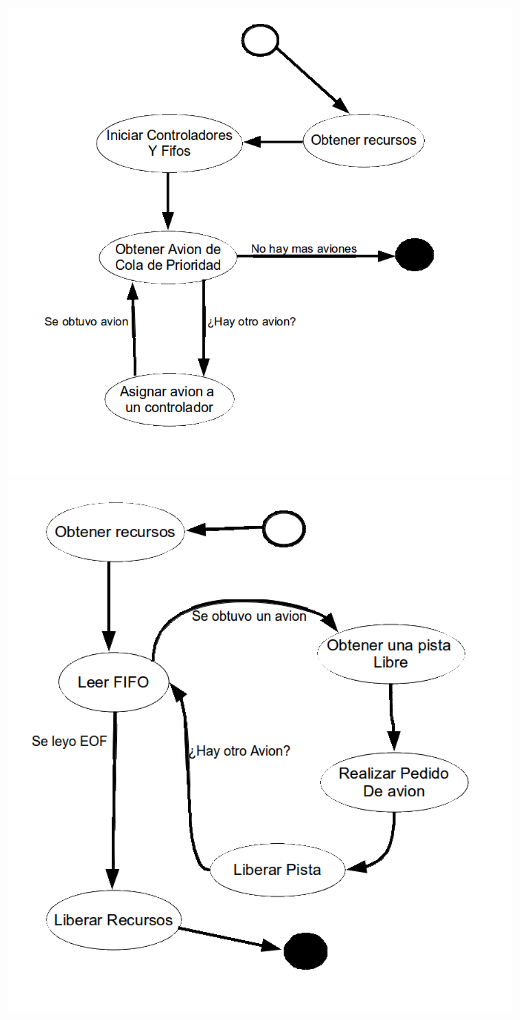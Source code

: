 \documentclass[a4paper,12pt,titlepage]{article}
\begin{document}
\includegraphics{./dia_est-dispatcherAviones}\\

\includegraphics{./dia_est-Controlador}\\
\end{document}
